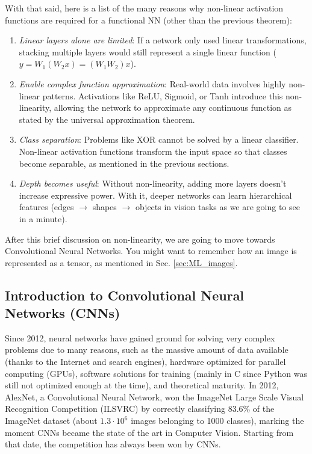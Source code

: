 With that said, here is a list of the many reasons why non-linear activation functions are required for a functional NN (other than the previous theorem): 
\begin{enumerate}
    \item \textit{Linear layers alone are limited}: If a network only used linear transformations, stacking multiple layers would still represent a single linear function ($y = W_1(W_2 x) = (W_1 W_2)x$).
    \item \textit{Enable complex function approximation}: Real-world data involves highly non-linear patterns. Activations like ReLU, Sigmoid, or Tanh introduce this non-linearity, allowing the network to approximate any continuous function as stated by the universal approximation theorem.
    \item \textit{Class separation}: Problems like XOR cannot be solved by a linear classifier. Non-linear activation functions transform the input space so that classes become separable, as mentioned in the previous sections.
    \item \textit{Depth becomes useful}: Without non-linearity, adding more layers doesn't increase expressive power. With it, deeper networks can learn hierarchical features (edges $\rightarrow$ shapes $\rightarrow$ objects in vision tasks as we are going to see in a minute).
\end{enumerate}
After this brief discussion on non-linearity, we are going to move  towards Convolutional Neural Networks. You might want to remember how an image is represented as a tensor, as mentioned in Sec. \ref{sec:ML_images}.

\subsection{Introduction to Convolutional Neural Networks (CNNs)}
Since 2012, neural networks have gained ground for solving very complex problems due to many reasons, such as the massive amount of data available (thanks to the Internet and search engines), hardware optimized for parallel computing (GPUs), software solutions for training (mainly in C since Python was still not optimized enough at the time), and theoretical maturity. In 2012, AlexNet, a Convolutional Neural Network, won the ImageNet Large Scale Visual Recognition Competition (ILSVRC) by correctly classifying 83.6\% of the ImageNet dataset (about $1.3 \cdot 10^6$ images belonging to 1000 classes), marking the moment CNNs became the state of the art in Computer Vision. Starting from that date, the competition has always been won by CNNs. 

